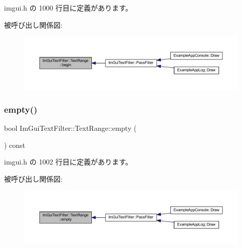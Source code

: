  imgui.\+h の 1000 行目に定義があります。

被呼び出し関係図\+:\nopagebreak
\begin{figure}[H]
\begin{center}
\leavevmode
\includegraphics[width=350pt]{struct_im_gui_text_filter_1_1_text_range_ab6b04c316f081e8ad7b044a8afbda63c_icgraph}
\end{center}
\end{figure}
\mbox{\label{struct_im_gui_text_filter_1_1_text_range_ab8d74e3b0ce63997746828e4b8ae3bbf}} 
\subsubsection{\texorpdfstring{empty()}{empty()}}
{\footnotesize\ttfamily bool Im\+Gui\+Text\+Filter\+::\+Text\+Range\+::empty (\begin{DoxyParamCaption}{ }\end{DoxyParamCaption}) const\hspace{0.3cm}{\ttfamily [inline]}}



 imgui.\+h の 1002 行目に定義があります。

被呼び出し関係図\+:\nopagebreak
\begin{figure}[H]
\begin{center}
\leavevmode
\includegraphics[width=350pt]{struct_im_gui_text_filter_1_1_text_range_ab8d74e3b0ce63997746828e4b8ae3bbf_icgraph}
\end{center}
\end{figure}
\mbox{\label{struct_im_gui_text_filter_1_1_text_range_aa5d60286f4c35bfdde82219ff079de9e}} 
